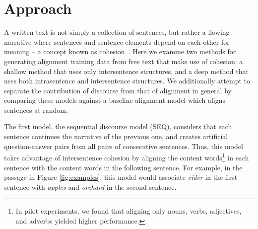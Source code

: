 \section{Approach}
\label{sec-naacl2015:approach}

A written text is not simply a collection of sentences, but rather a flowing narrative where sentences and sentence elements depend on each other for meaning -- a concept known as cohesion~\cite{halliday2014cohesion}.  
Here we examine two methods for generating alignment training data from free text that make use of cohesion: a shallow method that uses only intersentence structures, and a deep method that uses both intrasentence and intersentence structures.
We additionally attempt to separate the contribution of discourse from that of alignment in general by comparing these models against a baseline alignment model which aligns sentences at random.

The first model, the sequential discourse model (SEQ), considers that each sentence continues the narrative  of the previous one, and creates artificial question-answer pairs from all pairs of consecutive sentences.
Thus, this model takes advantage of intersentence cohesion by aligning the content words\footnote{In pilot experiments, we found that aligning only nouns, verbs, adjectives, and adverbs yielded higher performance.} in each sentence with the content words in the following sentence.  For example, in the passage in Figure \ref{fig:examples}, this model would associate \emph{cider} in the first sentence with \emph{apples} and \emph{orchard} in the second sentence.

